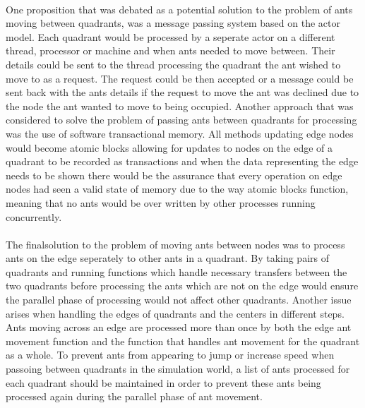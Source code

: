\documentclass[main.tex]{subfiles}
\begin{document}
\paragraph{}One proposition that was debated as a potential solution to the problem of ants moving between quadrants, was a message passing system based on the actor model. Each quadrant would be processed by a seperate actor on a different thread, processor or machine and when ants needed to move between. Their details could be sent to the thread processing the quadrant the ant wished to move to as a request. The request could be then accepted or a message could be sent back with the ants details if the request to move the ant was declined due to the node the ant wanted to move to being occupied. Another approach that was considered to solve the problem of passing ants between quadrants for processing was the use of software transactional memory. All methods updating edge nodes would become atomic blocks allowing for updates to nodes on the edge of a quadrant to be recorded as transactions and when the data representing the edge needs to be shown there would be the assurance that every operation on edge nodes had seen a valid state of memory due to the way atomic blocks function, meaning that no ants would be over written by other processes running concurrently.

\paragraph{} The finalsolution to the problem of moving ants between nodes was to process ants on the edge seperately to other ants in a quadrant. By taking pairs of quadrants and running functions which handle necessary transfers between the two quadrants before processing the ants which are not on the edge would ensure the parallel phase of processing would not affect other quadrants. Another issue arises when handling the edges of quadrants and the centers in different steps. Ants moving across an edge are processed more than once by both the edge ant movement function and the function that handles ant movement for the quadrant as a whole. To prevent ants from appearing to jump or increase speed when passoing between quadrants in the simulation world, a list of ants processed for each quadrant should be maintained in order to prevent these ants being processed again during the parallel phase of ant movement.
\end{document}
